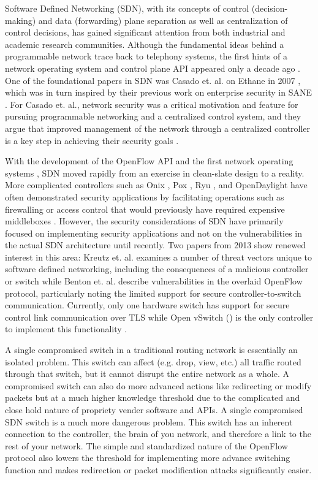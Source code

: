 Software Defined Networking (SDN), with its concepts of control (decision-making) and data (forwarding) plane separation as well as centralization of control decisions, has gained significant attention from both industrial and academic research communities.  Although the fundamental ideas behind a programmable network trace back to telephony systems, the first hints of a network operating system and control plane API appeared only a decade ago \cite{history}.  One of the foundational papers in SDN was Casado et. al. on Ethane in 2007 \cite{ethane}, which was in turn inspired by their previous work on enterprise security in SANE \cite{sane}.  For Casado et. al., network security was a critical motivation and feature for pursuing programmable networking and a centralized control system, and they argue that improved management of the network through a centralized controller is a key step in achieving their security goals \cite{ethane}.

With the development of the OpenFlow API and the first network operating systems \cite{openflow}\cite{nox}, SDN moved rapidly from an exercise in clean-slate design to a reality.  More complicated controllers such as Onix \cite{onix}, Pox \cite{pox}, Ryu \cite{ryu}, and OpenDaylight\cite{opendaylight} have often demonstrated security applications by facilitating operations such as firewalling or access control that would previously have required expensive middleboxes \cite{resonance}.  However, the security considerations of SDN have primarily focused on implementing security applications and not on the vulnerabilities in the actual SDN architecture until recently. Two papers from 2013 show renewed interest in this area: Kreutz et. al. examines a number of threat vectors unique to software defined networking, including the consequences of a malicious controller or switch \cite{sdnsec} while Benton et. al. describe vulnerabilities in the overlaid OpenFlow protocol, particularly noting the limited support for secure controller-to-switch communication. Currently, only one hardware switch has support for secure control link communication over TLS while Open vSwitch (\cite{openvswitch}) is the only controller to implement this functionality \cite{benton}. 

A single compromised switch in a traditional routing network is essentially an isolated problem. This switch can affect (e.g. drop, view, etc.) all traffic routed through that switch, but it cannot disrupt the entire network as a whole. A compromised switch can also do more advanced actions like redirecting or modify packets but at a much higher knowledge threshold due to the complicated and close hold nature of propriety vender software and APIs. A single compromised SDN switch is a much more dangerous problem. This switch has an inherent connection to the controller, the brain of you network, and therefore a link to the rest of your network. The simple and standardized nature of the OpenFlow protocol also lowers the threshold for implementing more advance switching function and makes redirection or packet modification attacks significantly easier. 

